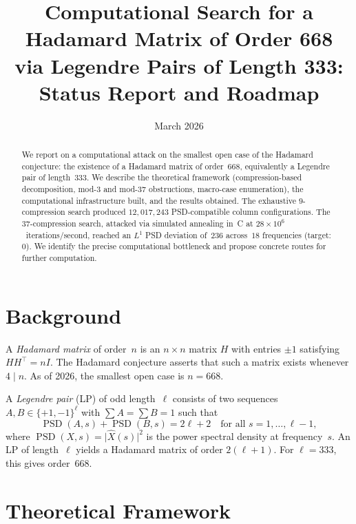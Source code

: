 \documentclass[11pt,a4paper]{article}
\title{Computational Search for a Hadamard Matrix of Order 668\\
via Legendre Pairs of Length 333:\\[4pt]
\large Status Report and Roadmap}
\author{}
\date{March 2026}
\newcommand{\abs}[1]{\lvert #1 \rvert}
\newcommand{\PSD}{\operatorname{PSD}}
\theoremstyle{plain}
\theoremstyle{definition}
\theoremstyle{remark}
\begin{document}
\maketitle

\begin{abstract}
We report on a computational attack on the smallest open case of the Hadamard conjecture: the existence of a Hadamard matrix of order~$668$, equivalently a Legendre pair of length~$333$. We describe the theoretical framework (compression-based decomposition, mod-$3$ and mod-$37$ obstructions, macro-case enumeration), the computational infrastructure built, and the results obtained. The exhaustive $9$-compression search produced $12{,}017{,}243$ PSD-compatible column configurations. The $37$-compression search, attacked via simulated annealing in~C at $28\times10^6$~iterations/second, reached an $L^1$ PSD deviation of~$236$ across~$18$ frequencies (target: $0$). We identify the precise computational bottleneck and propose concrete routes for further computation.
\end{abstract}

\tableofcontents

\section{Background}

A \emph{Hadamard matrix} of order~$n$ is an $n\times n$ matrix $H$ with entries $\pm1$ satisfying $HH^\top = nI$. The Hadamard conjecture asserts that such a matrix exists whenever $4\mid n$. As of 2026, the smallest open case is $n=668$.

A \emph{Legendre pair} (LP) of odd length~$\ell$ consists of two sequences $A,B\in\{+1,-1\}^\ell$ with $\sum A=\sum B=1$ such that
\[
\PSD(A,s)+\PSD(B,s)=2\ell+2\quad\text{for all }s=1,\dots,\ell-1,
\]
where $\PSD(X,s)=\abs{\widehat{X}(s)}^2$ is the power spectral density at frequency~$s$. An LP of length~$\ell$ yields a Hadamard matrix of order $2(\ell+1)$. For $\ell=333$, this gives order~$668$.

\section{Theoretical Framework}
\end{document}
